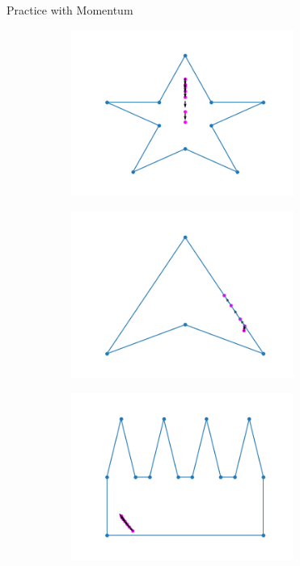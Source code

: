 \documentclass{beamer}
\begin{document}
\begin{frame}[noframenumbering]{Practice with Momentum}
	\begin{figure}[h!]
		\centering
		\begin{subfigure}{0.4\textwidth}
			\centering
			\includegraphics[width = 0.8\textwidth]{Images/pentagram_momentum.png}
			\caption{}
			\label{fig:star_gradient}
		\end{subfigure}
		\begin{subfigure}{0.4\textwidth}
			\centering
			\includegraphics[width = 0.8\textwidth]{Images/concave_triangle_momentum.png}
			\caption{}
			\label{fig:concave_gradient}
		\end{subfigure}
		\begin{subfigure}{0.4\textwidth}
			\centering
			\includegraphics[width = 0.8\textwidth]{Images/comb_momentum.png}

\end{subfigure}
\end{figure}
\end{frame}
\end{document}
